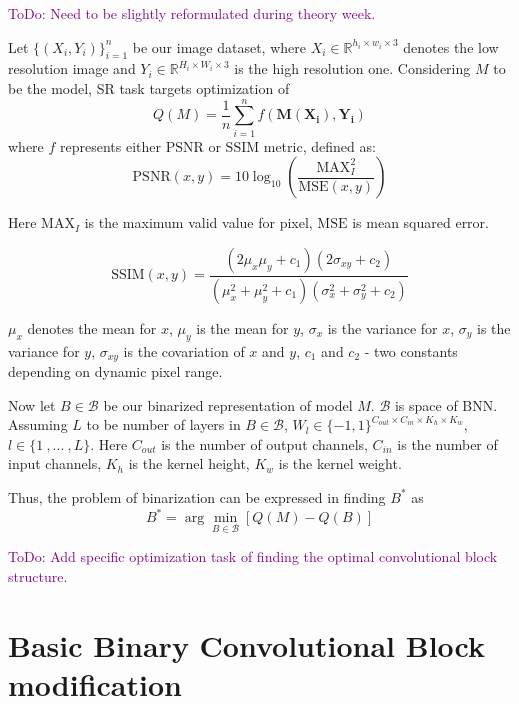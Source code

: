 \documentclass{article}
\newcommand{\TODO}[1]{\textcolor{purple}{ToDo: #1.}}
\begin{document}
\TODO{Need to be slightly reformulated during theory week}

Let $\{(X_i, Y_i)\}_{i=1}^n$ be our image dataset, where $X_i \in \mathbb{R}^{h_i \times w_i \times 3}$ denotes the low resolution image and $Y_i \in \mathbb{R}^{H_i \times W_i \times 3}$ is the high resolution one. Considering $M$ to be the model, SR task targets optimization of 
\begin{equation}
    Q(M) = \frac{1}{n}\sum\limits_{i=1}^nf(\mathbf{M}(\mathbf{X_i}), \mathbf{Y_i})
\end{equation}
where $f$ represents either $\text{PSNR}$ or $\text{SSIM}$ metric, defined as:
\begin{equation}
    \text{PSNR}(x, y) = 10 \log_{10} \left(\frac{\text{MAX}_I^2}{\text{MSE}(x, y)}\right)
\end{equation}


Here $\text{MAX}_I$ is the maximum valid value for pixel, $\text{MSE}$ is mean squared error.

\begin{equation}
    \text{SSIM}(x, y) = \frac{(2\mu_x\mu_y + c_1)(2\sigma_{xy} + c_2)}{(\mu_x^2 + \mu_y^2 + c_1)(\sigma_{x}^2 + \sigma_{y}^2 + c_2)}
\end{equation}

$\mu_x$ denotes the mean for $x$, $\mu_y$ is the mean for $y$, $\sigma_x$ is the variance for $x$, $\sigma_y$ is the variance for $y$, $\sigma_{xy}$ is the covariation of $x$ and $y$, $c_1$ and $c_2$ - two constants depending on dynamic pixel range.

Now let $B \in \mathcal{B}$ be our binarized representation of model $M$. $\mathcal{B}$ is space of BNN. Assuming $L$ to be number of layers in $B \in \mathcal{B}$, $W_l \in \{-1, 1\}^{C_{out} \times C_{in} \times K_h \times K_w}$, $l \in \{1 \ , ... \ , L\}$. Here $C_{out}$ is the number of output channels, $C_{in}$ is the number of input channels, $K_h$ is the kernel height, $K_w$ is the kernel weight. 


Thus, the problem of binarization can be expressed in finding $B^{*}$ as
\begin{equation}
    B^{*} = \arg\min\limits_{B \in \mathcal{B}} \left[Q(M) - Q(B)\right]
\end{equation}

\TODO{Add specific optimization task of finding the optimal convolutional block structure}

\section{Basic Binary Convolutional Block modification}
\end{document}
